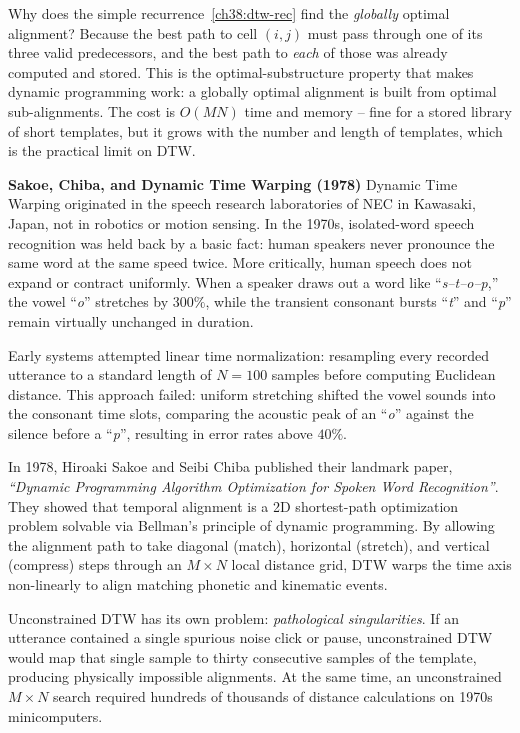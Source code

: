 \begin{whybox}
Why does the simple recurrence~\eqref{ch38:dtw-rec} find the \emph{globally}
optimal alignment? Because the best path to cell $(i,j)$ must pass through one of
its three valid predecessors, and the best path to \emph{each} of those was
already computed and stored. This is the optimal-substructure property that makes
dynamic programming work: a globally optimal alignment is built from optimal
sub-alignments. The cost is $O(MN)$ time and memory -- fine for a stored library
of short templates, but it grows with the number and length of templates, which
is the practical limit on DTW.
\end{whybox}

\begin{historybox}
\textbf{Sakoe, Chiba, and Dynamic Time Warping (1978)}
Dynamic Time Warping originated in the speech research laboratories of NEC in Kawasaki, Japan, not in robotics or motion sensing. In the 1970s, isolated-word speech recognition was held back by a basic fact: human speakers never pronounce the same word at the same speed twice. More critically, human speech does not expand or contract uniformly. When a speaker draws out a word like ``\emph{s--t--o--p},'' the vowel ``\emph{o}'' stretches by $300\%$, while the transient consonant bursts ``\emph{t}'' and ``\emph{p}'' remain virtually unchanged in duration.

Early systems attempted linear time normalization: resampling every recorded utterance to a standard length of $N = 100$ samples before computing Euclidean distance. This approach failed: uniform stretching shifted the vowel sounds into the consonant time slots, comparing the acoustic peak of an ``\emph{o}'' against the silence before a ``\emph{p}'', resulting in error rates above $40\%$.

In 1978, Hiroaki Sakoe and Seibi Chiba published their landmark paper, \emph{``Dynamic Programming Algorithm Optimization for Spoken Word Recognition''}. They showed that temporal alignment is a 2D shortest-path optimization problem solvable via Bellman's principle of dynamic programming. By allowing the alignment path to take diagonal (match), horizontal (stretch), and vertical (compress) steps through an $M\times N$ local distance grid, DTW warps the time axis non-linearly to align matching phonetic and kinematic events.

Unconstrained DTW has its own problem: \emph{pathological singularities}. If an utterance contained a single spurious noise click or pause, unconstrained DTW would map that single sample to thirty consecutive samples of the template, producing physically impossible alignments. At the same time, an unconstrained $M\times N$ search required hundreds of thousands of distance calculations on 1970s minicomputers.


\end{historybox}
